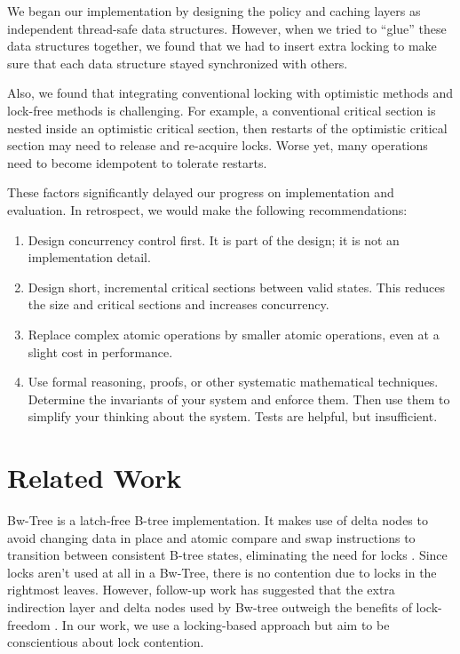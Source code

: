 \documentclass[twocolumn]{article}
\begin{document}
We began our implementation by designing the policy and caching layers as
independent thread-safe data structures. However, when we tried to “glue” these
data structures together, we found that we had to insert extra locking to make
sure that each data structure stayed synchronized with others.

Also, we found that integrating conventional locking with optimistic methods
and lock-free methods is challenging. For example, a conventional critical
section is nested inside an optimistic critical section, then restarts of the
optimistic critical section may need to release and re-acquire locks. Worse
yet, many operations need to become idempotent to tolerate restarts.

These factors significantly delayed our progress on implementation and
evaluation. In retrospect, we would make the following recommendations:

\begin{enumerate}
\item Design concurrency control first. It is part of the design; it is not an
implementation detail.
\item Design short, incremental critical sections between valid states. This
reduces the size and critical sections and increases concurrency.
\item Replace complex atomic operations by smaller atomic operations, even at a
slight cost in performance.
\item Use formal reasoning, proofs, or other systematic mathematical
techniques. Determine the invariants of your system and enforce them. Then use
them to simplify your thinking about the system. Tests are helpful, but
insufficient.
\end{enumerate}

\section{Related Work}

Bw-Tree is a latch-free B-tree implementation. It makes use of delta nodes to
avoid changing data in place and atomic compare and swap instructions to
transition between consistent B-tree states, eliminating the need for locks
\cite{bwtree}. Since locks aren’t used at all in a Bw-Tree, there is no contention due to
locks in the rightmost leaves. However, follow-up work has suggested that the
extra indirection layer and delta nodes used by Bw-tree outweigh the benefits
of lock-freedom \cite{critique}. In our work, we use a locking-based approach but aim to be
conscientious about lock contention.
\end{document}
